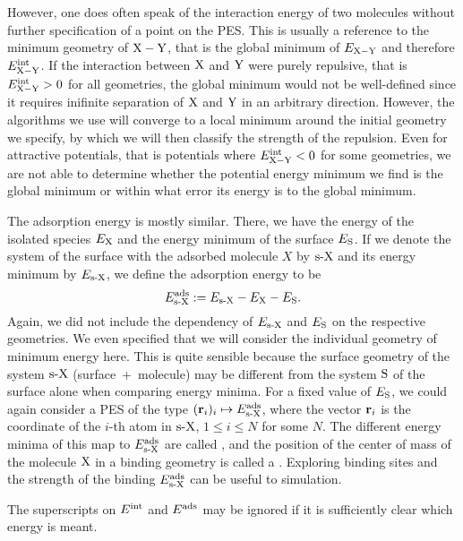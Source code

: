 \documentclass[8.5pt,twoside,twocolumn]{article}
\newcommand\eint{\enmat{E^{\te{int}}}}
\newcommand\eads{\enmat{E^{\te{ads}}}}
\renewcommand\r{\bo r}
\theoremstyle{standard}
\begin{document}
However, one does often speak of the interaction energy of two molecules without further specification
of a point on the PES. This is usually a reference to the minimum geometry
of $\XY$, that is the global minimum of $E_{\XY}$ and therefore $\eint_\XY$. If the interaction between $\X$ and $\Y$
were purely repulsive, that is $\eint_{\XY} > 0$ for all geometries, the global minimum would
not be well-defined since it requires inifinite separation of $\X$ and $\Y$ in an arbitrary direction.
However, the algorithms we use will converge to a local minimum around the initial geometry we
specify, by which we will then classify the strength of the repulsion. Even for attractive potentials,
that is potentials where $\eint_\XY < 0$ for some geometries, we are not able to determine whether 
the potential energy minimum we find is the global minimum or within what error its energy is
to the global minimum.

The adsorption energy is mostly similar. There, we have the energy of the isolated species
$E_\X$ and the energy minimum of the surface $E_{\S}$. If we denote the system of the surface 
with the adsorbed molecule $X$ by $\sX$ and its energy minimum by $E_\sX$, we define
the adsorption energy to be
\begin{equation}
 \eads_{\sX}:= E_{\sX} - E_\X - E_\S.
 \label{Theo:AdsorptionEnergy}
\end{equation}
Again, we did not include the dependency of $E_\sX$ and $E_\S$ on the respective geometries. We
even specified that we will consider the individual geometry of minimum energy here. This is quite sensible
because the surface geometry of the system $\sX$ \mbox{(surface + molecule)} may be different from the
system $\S$ of the surface alone when comparing energy minima. For a fixed value of $E_\S$, 
we could again consider a PES of the type \mbox{$(\bo r_i)_i \mapsto \eads_\sX$}, where the
vector $\r_i$ is the coordinate of the $i$-th atom in $\sX$, $1 \le i \le N$ for some $N$. The different energy minima of 
this map to $\eads_\sX$ are called , and the position of the
center of mass of the molecule $\X$ in a binding geometry is called a .
Exploring binding sites and the strength of the binding $\eads_\sX$ can be useful
to simulation.

The superscripts on $\eint$ and $\eads$ may be ignored if it is sufficiently clear which energy 
is meant.
\end{document}
